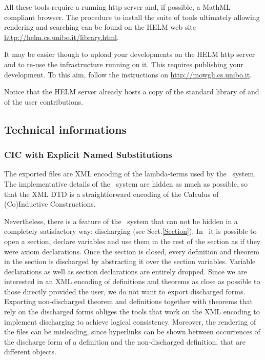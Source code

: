 All these tools require a running http server and, if possible, a
MathML compliant browser.  The procedure to install the suite of tools
ultimately allowing rendering and searching can be found on the HELM
web site \url{http://helm.cs.unibo.it/library.html}.

It may be easier though to upload your developments on the HELM http
server and to re-use the infrastructure running on it. This requires
publishing your development. To this aim, follow the instructions on
\url{http://mowgli.cs.unibo.it}.

Notice that the HELM server already hosts a copy of the standard
library of {\Coq} and of the {\Coq} user contributions.

\subsection{Technical informations}

\subsubsection{CIC with Explicit Named Substitutions}
                                                                               
The exported files are XML encoding of the lambda-terms used by the
\Coq\ system. The implementative details of the \Coq\ system are hidden as much
as possible, so that the XML DTD is a straightforward encoding of the
Calculus of (Co)Inductive Constructions.
                                                                                
Nevertheless, there is a feature of the \Coq\ system that can not be
hidden in a completely satisfactory way: discharging (see Sect.\ref{Section}).
In \Coq\ it is possible
to open a section, declare variables and use them in the rest of the section
as if they were axiom declarations. Once the section is closed, every definition and theorem in the section is discharged by abstracting it over the section
variables. Variable declarations as well as section declarations are entirely
dropped. Since we are interested in an XML encoding of definitions and
theorems as close as possible to those directly provided the user, we
do not want to export discharged forms. Exporting non-discharged theorem
and definitions together with theorems that rely on the discharged forms
obliges the tools that work on the XML encoding to implement discharging to
achieve logical consistency. Moreover, the rendering of the files can be
misleading, since hyperlinks can be shown between occurrences of the discharge
form of a definition and the non-discharged definition, that are different
objects.
                                                                                
